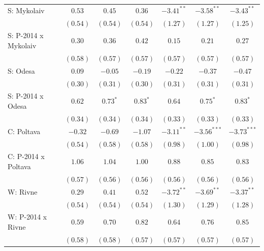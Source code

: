 \begin{table}
\begin{center}
\begin{small}
\begin{tabular}{l c c c c c c}
S: Mykolaiv                 & $0.53$        & $0.45$        & $0.36$         & $-3.41^{**}$  & $-3.58^{**}$  & $-3.43^{**}$  \\
                            & $(0.54)$      & $(0.54)$      & $(0.54)$       & $(1.27)$      & $(1.27)$      & $(1.25)$      \\
S: P-2014 x Mykolaiv        & $0.30$        & $0.36$        & $0.42$         & $0.15$        & $0.21$        & $0.27$        \\
                            & $(0.58)$      & $(0.57)$      & $(0.57)$       & $(0.57)$      & $(0.57)$      & $(0.57)$      \\
S: Odesa                    & $0.09$        & $-0.05$       & $-0.19$        & $-0.22$       & $-0.37$       & $-0.47$       \\
                            & $(0.30)$      & $(0.31)$      & $(0.30)$       & $(0.31)$      & $(0.31)$      & $(0.31)$      \\
S: P-2014 x Odesa           & $0.62$        & $0.73^{*}$    & $0.83^{*}$     & $0.64$        & $0.75^{*}$    & $0.83^{*}$    \\
                            & $(0.34)$      & $(0.34)$      & $(0.34)$       & $(0.33)$      & $(0.33)$      & $(0.33)$      \\
C: Poltava                  & $-0.32$       & $-0.69$       & $-1.07$        & $-3.11^{**}$  & $-3.56^{***}$ & $-3.73^{***}$ \\
                            & $(0.54)$      & $(0.58)$      & $(0.58)$       & $(0.98)$      & $(1.00)$      & $(0.98)$      \\
C: P-2014 x Poltava         & $1.06$        & $1.04$        & $1.00$         & $0.88$        & $0.85$        & $0.83$        \\
                            & $(0.57)$      & $(0.56)$      & $(0.56)$       & $(0.56)$      & $(0.56)$      & $(0.56)$      \\
W: Rivne                    & $0.29$        & $0.41$        & $0.52$         & $-3.72^{**}$  & $-3.69^{**}$  & $-3.37^{**}$  \\
                            & $(0.54)$      & $(0.54)$      & $(0.54)$       & $(1.30)$      & $(1.29)$      & $(1.28)$      \\
W: P-2014 x Rivne           & $0.59$        & $0.70$        & $0.82$         & $0.64$        & $0.76$        & $0.85$        \\
                            & $(0.58)$      & $(0.58)$      & $(0.57)$       & $(0.57)$      & $(0.57)$      & $(0.57)$      \\

\end{tabular}
\end{small}
\end{center}
\end{table}
